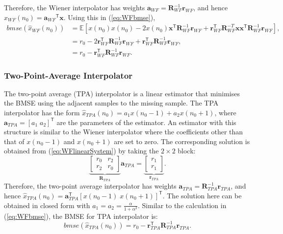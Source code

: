 \documentclass[11pt]{article}
\newcommand{\br}{\mathbf{r}}
\newcommand{\ba}{\mathbf{a}}
\newcommand{\bx}{\mathbf{x}}
\newcommand{\bR}{\mathbf{R}}
\newcommand{\Ex}{\mathbb{E}}
\newcommand{\TT}{\mathsf{T}}
\begin{document}
Therefore, the Wiener interpolator has weights $\ba_{WF} = \bR_{WF}^{-1} \br_{WF}$, and hence $\hat{x}_{WF}(n_{0}) = {\ba_{WF}}^{\TT}\bx$. Using this in (\ref{eq:WFbmse}),
\begin{equation}
\begin{split}
	bmse(\hat{x}_{WF}(n_{0})) &= \Ex \left[ x(n_{0})x(n_{0}) - 2x(n_{0}) \bx^{\TT} \bR_{WF}^{-1} \br_{WF} + \br_{WF}^{\TT} \bR_{WF}^{-T} \bx \bx^{\TT} \bR_{WF}^{-1} \br_{WF} \right], \\
	&= r_{0} - 2 \br_{WF}^{\TT} \bR_{WF}^{-1} \br_{WF} + \br_{WF}^{\TT} \bR_{WF}^{-1} \br_{WF}, \\
	&= r_{0} - \br_{WF}^{\TT} \bR_{WF}^{-1} \br_{WF}.
\end{split}
\label{eq:WFbmse}
\end{equation}


\subsubsection*{Two-Point-Average Interpolator}
\label{subsubsec:avginterp}

The two-point average (TPA) interpolator is a linear estimator that minimises the BMSE using the adjacent samples to the missing sample. The TPA interpolator has the form $\hat{x}_{TPA}(n_{0}) = a_{1}x(n_{0}-1) + a_{2}x(n_{0}+1)$, where $\ba_{TPA} = [a_{1} \; a_{2}]^{\TT}$ are the parameters of the estimator. An estimator with this structure is similar to the Wiener interpolator where the coefficients other than that of $x(n_{0}-1)$ and $x(n_{0}+1)$ are set to zero. The corresponding solution is obtained from (\ref{eq:WFlinearSystem}) by taking the $2\times 2$ block:
\begin{equation}
	\underbrace{\begin{bmatrix}
		r_{0} & r_{2} \\
		r_{2} & r_{0}
	\end{bmatrix}}_{\bR_{TPA}} \ba_{TPA} = 
	\underbrace{\begin{bmatrix}
		r_{1} \\ r_{1}
	\end{bmatrix}}_{\br_{TPA}}.
\end{equation}
Therefore, the two-point average interpolator has weights $\ba_{TPA} = \bR_{TPA}^{-1}\br_{TPA}$, and hence $\hat{x}_{TPA}(n_{0}) = \ba_{TPA}^{\TT} [x(n_{0}-1) \; x(n_{0}+1)]^{\TT}$. The solution here can be obtained in closed form with $\displaystyle a_{1} = a_{2} = \frac{\alpha}{1+\alpha^{2}}$. Similar to the calculation in (\ref{eq:WFbmse}), the BMSE for TPA interpolator is:
\begin{equation}
	bmse(\hat{x}_{TPA}(n_{0})) = r_{0} - \br_{TPA}^{\TT} \bR_{TPA}^{-1} \br_{TPA}.
\label{eq:TPAbmse}
\end{equation}
\end{document}
